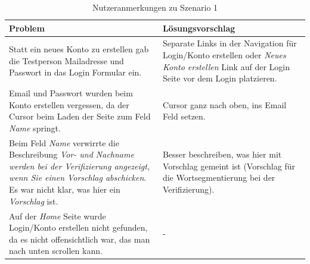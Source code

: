 \begin{table}[h!]
	\centering
	\begin{tabular}{|p{}|p{}|}
		\hline
		\textbf{Problem} & \textbf{Lösungsvorschlag}\\
		\hline
		\hline
		Statt ein neues Konto zu erstellen gab die Testperson Mailadresse und Passwort in das Login Formular ein. & Separate Links in der Navigation für Login/Konto erstellen oder \textit{Neues Konto erstellen} Link auf der Login Seite vor dem Login platzieren.\\
		\hline
		Email und Passwort wurden beim Konto erstellen vergessen, da der Cursor beim Laden der Seite zum Feld \textit{Name} springt. & Cursor ganz nach oben, ins Email Feld setzen.\\
		\hline
		Beim Feld \textit{Name} verwirrte die Beschreibung \textit{Vor- und Nachname werden bei der Verifizierung angezeigt, wenn Sie einen Vorschlag abschicken}. Es war nicht klar, was hier ein \textit{Vorschlag} ist. & Besser beschreiben, was hier mit Vorschlag gemeint ist (Vorschlag für die Wortsegmentierung bei der Verifizierung).\\
		\hline
		Auf der \textit{Home} Seite wurde Login/Konto erstellen nicht gefunden, da es nicht offensichtlich war, das man nach unten scrollen kann. & -\\
		\hline
	\end{tabular}
	\caption{Nutzeranmerkungen zu Szenario 1}
	\label{table:szenario1}
\end{table}
\newpage

